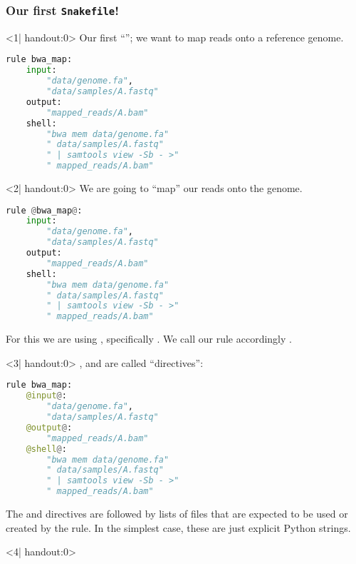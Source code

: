 \begin{frame}[fragile]
  \frametitle{Our first \texttt{Snakefile}!}
  \begin{onlyenv}<1| handout:0>
    Our first ``''; we want to map reads onto a reference genome. 
    \begin{lstlisting}[language=Python,style=Python]
rule bwa_map:
    input:
        "data/genome.fa",
        "data/samples/A.fastq"
    output:
        "mapped_reads/A.bam"
    shell:
        "bwa mem data/genome.fa"
        " data/samples/A.fastq"
        " | samtools view -Sb - >"
        " mapped_reads/A.bam"
    \end{lstlisting}
    \end{onlyenv}
  \begin{onlyenv}<2| handout:0>
   We are going to ``map'' our reads onto the genome.
   \begin{lstlisting}[language=Python,style=Python]
rule @bwa_map@:
    input:
        "data/genome.fa",
        "data/samples/A.fastq"
    output:
        "mapped_reads/A.bam"
    shell:
        "bwa mem data/genome.fa"
        " data/samples/A.fastq"
        " | samtools view -Sb - >"
        " mapped_reads/A.bam"
    \end{lstlisting}
    For this we are using , specifically . We call our rule accordingly .
  \end{onlyenv}
  \begin{onlyenv}<3| handout:0>
   ,  and  are called ``directives'':
   \begin{lstlisting}[language=Python,style=Python]
rule bwa_map:
    @input@:
        "data/genome.fa",
        "data/samples/A.fastq"
    @output@:
        "mapped_reads/A.bam"
    @shell@:
        "bwa mem data/genome.fa"
        " data/samples/A.fastq"
        " | samtools view -Sb - >"
        " mapped_reads/A.bam"
    \end{lstlisting}
    The  and  directives are followed by lists of files that are expected to be used or created by the rule. In the simplest case, these are just explicit Python strings.
  \end{onlyenv}
  \begin{onlyenv}<4| handout:0>

\end{onlyenv}
\end{frame}
